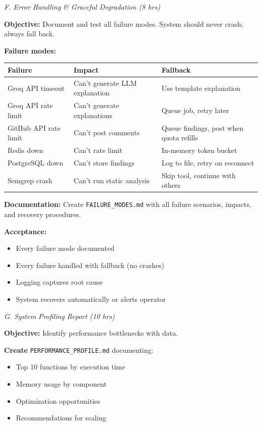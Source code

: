 \documentclass[11pt,a4paper]{article}
\begin{document}
\textit{F. Error Handling \& Graceful Degradation (8 hrs)}

\textbf{Objective:} Document and test all failure modes. System should never crash; always fall back.

\textbf{Failure modes:}

\begin{table}[h]
\centering
\small
\begin{tabular}{p{4cm}p{3cm}p{5cm}}
\toprule
\textbf{Failure} & \textbf{Impact} & \textbf{Fallback} \\
\midrule
Groq API timeout & Can't generate LLM explanation & Use template explanation \\
Groq API rate limit & Can't generate explanations & Queue job, retry later \\
GitHub API rate limit & Can't post comments & Queue findings, post when quota refills \\
Redis down & Can't rate limit & In-memory token bucket \\
PostgreSQL down & Can't store findings & Log to file, retry on reconnect \\
Semgrep crash & Can't run static analysis & Skip tool, continue with others \\
\bottomrule
\end{tabular}
\end{table}

\textbf{Documentation:} Create \texttt{FAILURE\_MODES.md} with all failure scenarios, impacts, and recovery procedures.

\textbf{Acceptance:}
\begin{itemize}[leftmargin=*]
    \item[$\checkmark$] Every failure mode documented
    \item[$\checkmark$] Every failure handled with fallback (no crashes)
    \item[$\checkmark$] Logging captures root cause
    \item[$\checkmark$] System recovers automatically or alerts operator
\end{itemize}

\textit{G. System Profiling Report (10 hrs)}

\textbf{Objective:} Identify performance bottlenecks with data.

\textbf{Create} \texttt{PERFORMANCE\_PROFILE.md} documenting:
\begin{itemize}[leftmargin=*]
    \item Top 10 functions by execution time
    \item Memory usage by component
    \item Optimization opportunities
    \item Recommendations for scaling
\end{itemize}
\end{document}
